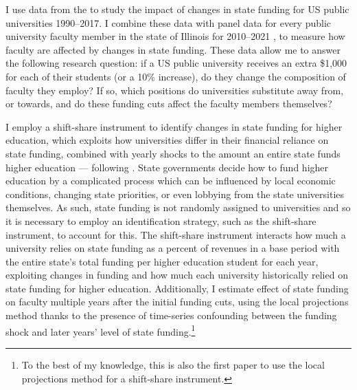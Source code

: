 I use data from the \cite{ipeds} to study the impact of changes in state funding for US public universities 1990--2017.
I combine these data with panel data for every public university faculty member in the state of Illinois for 2010--2021 \citep{ibhed}, to measure how faculty are affected by changes in state funding.
These data allow me to answer the following research question: if a US public university receives an extra \$1,000 for each of their students (or a 10\% increase), do they change the composition of faculty they employ?
If so, which positions do universities substitute away from, or towards, and do these funding cuts affect the faculty members themselves?

I employ a shift-share instrument to identify changes in state funding for higher education, which exploits how universities differ in their financial reliance on state funding, combined with yearly shocks to the amount an entire state funds higher education --- following \cite{NBERw23736,NBERw27885}.
State governments decide how to fund higher education by a complicated process which can be influenced by local economic conditions, changing state priorities, or even lobbying from the state universities themselves.
As such, state funding is not randomly assigned to universities and so it is necessary to employ an identification strategy, such as the shift-share instrument, to account for this.
The shift-share instrument interacts how much a university relies on state funding as a percent of revenues in a base period with the entire state's total funding per higher education student for each year, exploiting changes in funding and how much each university historically relied on state funding for higher education.
Additionally, I estimate effect of state funding on faculty multiple years after the initial funding cuts, using the local projections method thanks to the presence of time-series confounding between the funding shock and later years' level of state funding.\footnote{
    To the best of my knowledge, this is also the first paper to use the local projections method for a shift-share instrument.
}

